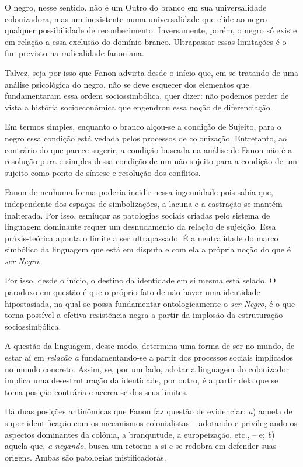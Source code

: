 O negro, nesse sentido, não é um Outro do branco em sua universalidade
colonizadora, mas um inexistente numa universalidade que elide ao negro
qualquer possibilidade de reconhecimento. Inversamente, porém, o negro
só existe em relação a essa exclusão do domínio branco. Ultrapassar
essas limitações é o fim previsto na radicalidade fanoniana.

Talvez, seja por isso que Fanon advirta desde o início que, em se
tratando de uma análise psicológica do negro, não se deve esquecer dos
elementos que fundamentaram essa ordem sociossimbólica, quer dizer: não
podemos perder de vista a história socioeconômica que engendrou essa
noção de diferenciação.

Em termos simples, enquanto o branco alçou-se a condição de Sujeito,
para o negro essa condição está vedada pelos processos de colonização.
Entretanto, ao contrário do que parece sugerir, a condição buscada na
análise de Fanon não é a resolução pura e simples dessa condição de um
não-sujeito para a condição de um sujeito como ponto de síntese e
resolução dos conflitos.

Fanon de nenhuma forma poderia incidir nessa ingenuidade pois sabia que,
independente dos espaços de simbolizações, a lacuna e a castração se
mantém inalterada. Por isso, esmiuçar as patologias sociais criadas pelo
sistema de linguagem dominante requer um desnudamento da relação de
sujeição. Essa práxis-teórica aponta o limite a ser ultrapassado. É a
neutralidade do marco simbólico da linguagem que está em disputa e com
ela a própria noção do que é \emph{ser Negro}.

Por isso, desde o início, o destino da identidade em si mesma está
selado. O paradoxo em questão é que o próprio fato de não haver uma
identidade hipostasiada, na qual se possa fundamentar ontologicamente o
\emph{ser Negro}, é o que torna possível a efetiva resistência negra a
partir da implosão da estruturação sociossimbólica.

A questão da linguagem, desse modo, determina uma forma de ser no mundo,
de estar aí em \emph{relação a} fundamentando-se a partir dos processos
sociais implicados no mundo concreto. Assim, se, por um lado, adotar a
linguagem do colonizador implica uma desestruturação da identidade, por
outro, é a partir dela que se toma posição contrária e acerca-se dos
seus limites.

Há duas posições antinômicas que Fanon faz questão de evidenciar:
\emph{a}) aquela de super-identificação com os mecanismos colonialistas
-- adotando e privilegiando os aspectos dominantes da colônia, a
branquitude, a europeização, etc., -- e; \emph{b}) aquela que, \emph{a
negando}, busca um retorno a si e se redobra em defender suas origens.
Ambas são patologias mistificadoras.

